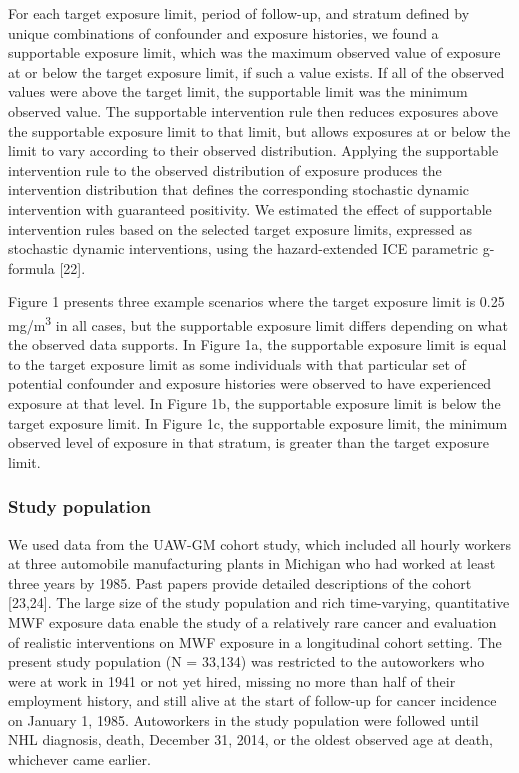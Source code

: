 \documentclass[
  11pt,
  letterpaper,
  DIV=11,
  numbers=noendperiod]{scrartcl}
\begin{document}
For each target exposure limit, period of follow-up, and stratum defined
by unique combinations of confounder and exposure histories, we found a
supportable exposure limit, which was the maximum observed value of
exposure at or below the target exposure limit, if such a value exists.
If all of the observed values were above the target limit, the
supportable limit was the minimum observed value. The supportable
intervention rule then reduces exposures above the supportable exposure
limit to that limit, but allows exposures at or below the limit to vary
according to their observed distribution. Applying the supportable
intervention rule to the observed distribution of exposure produces the
intervention distribution that defines the corresponding stochastic
dynamic intervention with guaranteed positivity. We estimated the effect
of supportable intervention rules based on the selected target exposure
limits, expressed as stochastic dynamic interventions, using the
hazard-extended ICE parametric g-formula {[}22{]}.

Figure 1 presents three example scenarios where the target exposure
limit is 0.25 mg/m\textsuperscript{3} in all cases, but the supportable
exposure limit differs depending on what the observed data supports. In
Figure 1a, the supportable exposure limit is equal to the target
exposure limit as some individuals with that particular set of potential
confounder and exposure histories were observed to have experienced
exposure at that level. In Figure 1b, the supportable exposure limit is
below the target exposure limit. In Figure 1c, the supportable exposure
limit, the minimum observed level of exposure in that stratum, is
greater than the target exposure limit.

\subsubsection{Study population}\label{study-population}

We used data from the UAW-GM cohort study, which included all hourly
workers at three automobile manufacturing plants in Michigan who had
worked at least three years by 1985. Past papers provide detailed
descriptions of the cohort {[}23,24{]}. The large size of the study
population and rich time-varying, quantitative MWF exposure data enable
the study of a relatively rare cancer and evaluation of realistic
interventions on MWF exposure in a longitudinal cohort setting. The
present study population (N = 33,134) was restricted to the autoworkers
who were at work in 1941 or not yet hired, missing no more than half of
their employment history, and still alive at the start of follow-up for
cancer incidence on January 1, 1985. Autoworkers in the study population
were followed until NHL diagnosis, death, December 31, 2014, or the
oldest observed age at death, whichever came earlier.
\end{document}
